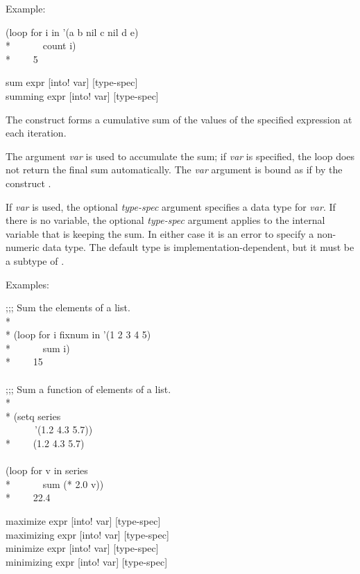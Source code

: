 \begin{new}
\begin{defloop}
Example:
\begin{lisp}
(loop for i in '(a b nil c nil d e) \\*
~~~~~~count i) \\*
~~~\EV~5
\end{lisp}
\end{defloop}


\begin{defloop}
sum expr [\!into! var] [type-spec] \\
summing expr [\!into! var] [type-spec]

The  construct forms a cumulative sum of the values of the
specified expression at each iteration.

The argument {\it var\/} is used to accumulate
the sum; if {\it var} is specified, the loop
does not return the final sum automatically.  The {\it var\/} argument
is bound as if by the construct .

If  {\it var\/} is used, the optional
{\it type-spec\/} argument specifies a data type for {\it var\/}.
If there is no  variable, the optional {\it type-spec\/}
argument applies to the internal variable that is keeping the sum.
In either case it is an error to specify a non-numeric 
data type.
The default type is implementation-dependent, but it must be a subtype
of .

Examples:
\begin{lisp}
;;; Sum the elements of a list. \\*
\\*
(loop for i fixnum in '(1 2 3 4 5) \\*
~~~~~~sum i) \\*
~~~\EV~15 \\
\\
;;; Sum a function of elements of a list. \\*
\\*
(setq series \\
~~~~~~'(1.2 4.3 5.7)) \\*
~~~\EV~(1.2 4.3 5.7) \\
\\
(loop for v in series  \\*
~~~~~~sum (* 2.0 v)) \\*
~~~\EV~22.4
\end{lisp}
\end{defloop}

\begin{defloop}
maximize expr [\!into! var] [type-spec] \\
maximizing expr [\!into! var] [type-spec] \\
minimize expr [\!into! var] [type-spec] \\
minimizing expr [\!into! var] [type-spec]


\end{defloop}
\end{new}
